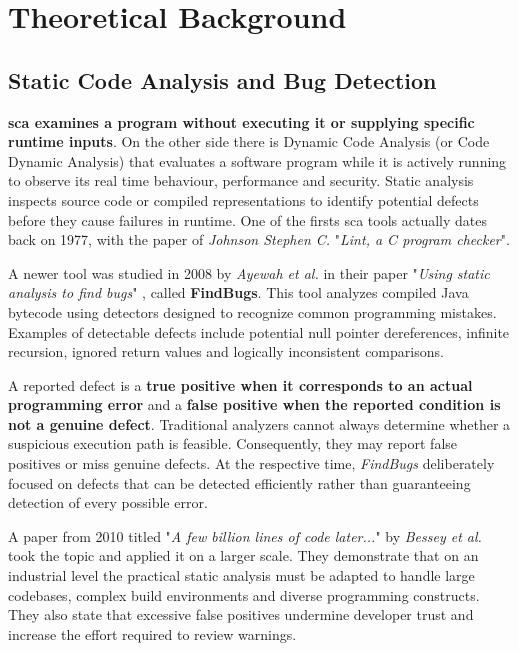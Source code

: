 \section{Theoretical Background} \label{sec:theoreticalbackground}



\subsection{Static Code Analysis and Bug Detection}
 
\hspace{0.6em} \textbf{\gls{sca} examines a program without executing it or supplying specific runtime inputs}. On the other side there is Dynamic Code Analysis (or Code Dynamic Analysis) that evaluates a software program while it is actively running to observe its real time behaviour, performance and security. Static analysis inspects source code or compiled representations to identify potential defects before they cause failures in runtime. One of the firsts \gls{sca} tools actually dates back on 1977, with the paper of \textit{Johnson Stephen C.} "\textit{Lint, a C program checker}".

\hspace{0.6em} A newer tool was studied in 2008 by \textit{Ayewah et al.} in their paper "\textit{Using static analysis to find bugs}" \cite{paperreference1_ayewah2008using}, called \textbf{FindBugs}. This tool analyzes compiled Java bytecode using detectors designed to recognize common programming mistakes. Examples of detectable defects include potential null pointer dereferences, infinite recursion, ignored return values and logically inconsistent comparisons.

\hspace{0.6em} A reported defect is a \textbf{true positive when it corresponds to an actual programming error} and a \textbf{false positive when the reported condition is not a genuine defect}. Traditional analyzers cannot always determine whether a suspicious execution path is feasible. Consequently, they may report false positives or miss genuine defects. At the respective time, \textit{FindBugs} deliberately focused on defects that can be detected efficiently rather than guaranteeing detection of every possible error.

\hspace{0.6em} A paper from 2010 titled "\textit{A few billion lines of code later...}" by \textit{Bessey et al.} \cite{paperreference2_bessey2010few} took the topic and applied it on a larger scale. They demonstrate that on an industrial level the practical static analysis must be adapted to handle large codebases, complex build environments and diverse programming constructs. They also state that excessive false positives undermine developer trust and increase the effort required to review warnings.


